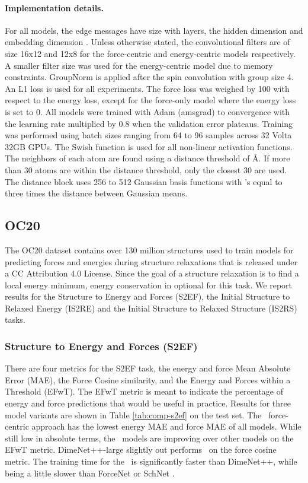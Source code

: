 \paragraph{Implementation details.}

For all models, the edge messages have size  with  layers, the hidden dimension  and embedding dimension . Unless otherwise stated, the convolutional filters are of size 16x12 and 12x8 for the force-centric and energy-centric models respectively. A smaller filter size was used for the energy-centric model due to memory constraints. GroupNorm \cite{wu2018group} is applied after the spin convolution with group size 4. An L1 loss is used for all experiments. The force loss was weighed by 100 with respect to the energy loss, except for the force-only model where the energy loss is set to 0. All models were trained with Adam (amsgrad) to convergence with the learning rate multiplied by 0.8 when the validation error plateaus. Training was performed using batch sizes ranging from 64 to 96 samples across 32 Volta 32GB GPUs. The Swish \cite{ramachandran2017searching} function is used for all non-linear activation functions. The neighbors  of each atom  are found using a distance threshold of \AA. If more than 30 atoms are within the distance threshold, only the closest 30 are used.  The distance block uses 256 to 512 Gaussian basis functions with 's equal to three times the distance between Gaussian means. 

\subsection{OC20}

The OC20 dataset \cite{OC20} contains over 130 million structures used to train models for predicting forces and energies during structure relaxations that is released under a CC Attribution 4.0 License. Since the goal of a structure relaxation is to find a local energy minimum, energy conservation in optional for this task. We report results for the Structure to Energy and Forces (S2EF), the Initial Structure to Relaxed Energy (IS2RE) and the Initial Structure to Relaxed Structure (IS2RS) tasks. 

\subsubsection{Structure to Energy and Forces (S2EF)}

There are four metrics for the S2EF task, the energy and force Mean Absolute Error (MAE), the Force Cosine similarity, and the Energy and Forces within a Threshold (EFwT). The EFwT metric is meant to indicate the percentage of energy and force predictions that would be useful in practice. Results for three model variants are shown in Table \ref{tab:comp-s2ef} on the test set. The \model~force-centric approach has the lowest energy MAE and force MAE of all models.  While still low in absolute terms, the \model~models are improving over other models on the EFwT metric. DimeNet++-large slightly out performs \model~on the force cosine metric. The training time for the \model~is significantly faster than DimeNet++, while being a little slower than ForceNet \cite{hu2021forcenet} or SchNet \cite{schutt2018schnet}.


